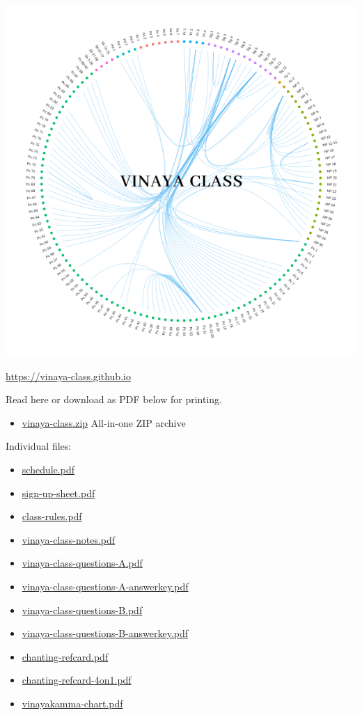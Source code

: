 \includegraphics{../../src/includes/figures/vinaya-class-title.png}

\url{https://vinaya-class.github.io}

Read here or download as PDF below for printing.

\begin{itemize}
\tightlist
\item
  \href{./includes/docs/vinaya-class.zip}{vinaya-class.zip} All-in-one
  ZIP archive
\end{itemize}

Individual files:

\begin{itemize}
\tightlist
\item
  \href{./includes/docs/schedule.pdf}{schedule.pdf}
\item
  \href{./includes/docs/sign-up-sheet.pdf}{sign-up-sheet.pdf}
\item
  \href{./includes/docs/class-rules.pdf}{class-rules.pdf}
\item
  \href{./includes/docs/vinaya-class-notes.pdf}{vinaya-class-notes.pdf}
\item
  \href{./includes/docs/vinaya-class-questions-A.pdf}{vinaya-class-questions-A.pdf}
\item
  \href{./includes/docs/vinaya-class-questions-A-answerkey.pdf}{vinaya-class-questions-A-answerkey.pdf}
\item
  \href{./includes/docs/vinaya-class-questions-B.pdf}{vinaya-class-questions-B.pdf}
\item
  \href{./includes/docs/vinaya-class-questions-B-answerkey.pdf}{vinaya-class-questions-B-answerkey.pdf}
\item
  \href{./includes/docs/chanting-refcard.pdf}{chanting-refcard.pdf}
\item
  \href{./includes/docs/chanting-refcard-4on1.pdf}{chanting-refcard-4on1.pdf}
\item
  \href{./includes/docs/vinayakamma-chart.pdf}{vinayakamma-chart.pdf}
\end{itemize}

